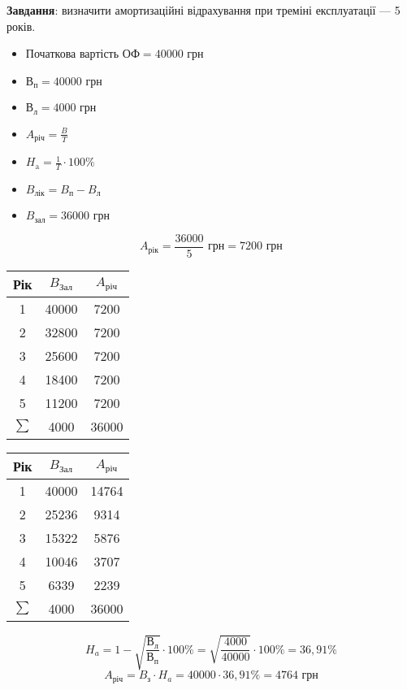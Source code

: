 \textbf{Завдання}: визначити амортизаційні відрахування при треміні експлуатації --- 5 років.

\begin{multicols}{2}
  \begin{itemize}
  \item [] Початкова вартість $ОФ = 40000\text{~грн}$
  \item [] $\text{В}_\text{п} = 40000\text{~грн}$
  \item [] $\text{В}_\text{л} = 4000\text{~грн}$
  \item [] $A_\text{річ}=\frac{B}{T}$
  \item [] $H_\text{a} = \frac{1}{T} \cdot 100 \%$
  \item [] $B_\text{лік} = B_\text{п} - B_\text{л}$
  \item [] $B_\text{зал} = 36000\text{~грн}$
  \end{itemize}
\end{multicols}

$$A_\text{рік} = \frac{36000}{5}\text{~грн} = 7200\text{~грн}$$

\begin{table}[!htb]
\begin{subtable}{.5\linewidth}
  \centering
  \begin{tabular}{|c|c|c|}
    \hline
    Рік    & $B_\text{Зал}$ & $A_\text{річ}$ \\ \hline
    1      & 40000          & 7200           \\ \hline
    2      & 32800          & 7200           \\ \hline
    3      & 25600          & 7200           \\ \hline
    4      & 18400          & 7200           \\ \hline
    5      & 11200          & 7200           \\ \hline
    $\sum$ & 4000           & 36000          \\ \hline
  \end{tabular}
\end{subtable}
\begin{subtable}{.5\linewidth}
  \centering
  \begin{tabular}{|c|c|c|}
    \hline
    Рік    & $B_\text{Зал}$ & $A_\text{річ}$ \\ \hline
    1      & 40000          & 14764      \\ \hline
    2      & 25236          & 9314       \\ \hline
    3      & 15322          & 5876       \\ \hline
    4      & 10046          & 3707       \\ \hline
    5      & 6339          & 2239        \\ \hline
    $\sum$ & 4000           & 36000      \\ \hline
  \end{tabular}
\end{subtable}
\end{table}

$$H_a = 1 - \sqrt{\frac{\text{В}_\text{л}}{\text{В}_\text{п}}} \cdot 100\% =
\sqrt{\frac{4000}{40000}} \cdot 100\% = 36,91 \%$$
$$A_\text{річ}=B_\text{з} \cdot H_a = 40000 \cdot 36,91 \% = 4764 \text{~грн}$$